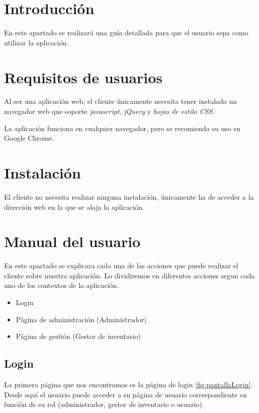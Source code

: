 
\section{Introducción}

En este apartado se realizará una guía detallada para que el usuario sepa como utilizar la aplicación.

\section{Requisitos de usuarios}

Al ser una aplicación web, el cliente únicamente necesita tener instalado un navegador web que soporte \textit{javascript}, \textit{jQuery} y \textit{hojas de estilo CSS}. 

La aplicación funciona en cualquier navegador, pero se recomienda su uso en Google Chrome.

\section{Instalación}

El cliente no necesita realizar ninguna instalación, únicamente ha de acceder a la dirección web en la que se aloja la aplicación.

\section{Manual del usuario}

En este apartado se explicara cada una de las acciones que puede realizar el cliente sobre nuestra aplicación. Lo dividiremos en diferentes acciones segun cada uno de los contextos de la aplicación.

\begin{itemize}
	\item Login
	\item Página de administración (Administrador)
	\item Página de gestión (Gestor de inventario)
\end{itemize}

\subsection{Login}

La primera página que nos encontramos es la página de login \ref{fig:pantallaLogin}. Desde aquí el usuario puede acceder a su página de usuario correspondiente en función de su rol (administrador, gestor de inventario o usuario).

